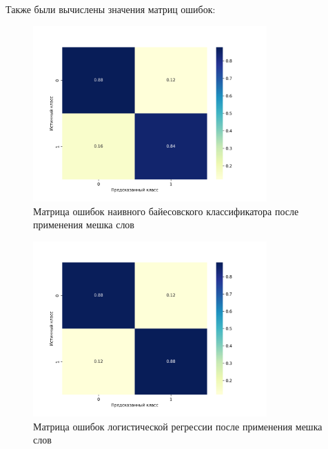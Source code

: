 \documentclass[bachelor, och, coursework]{SCWorks}
\begin{document}
        Также были вычислены значения матриц ошибок:

        \begin{figure}[H]
            \centering
            \includegraphics[width=0.8\textwidth]{pic/BOW-NB.png}
            \caption{Матрица ошибок наивного байесовского классификатора после применения мешка слов}
        \end{figure}

        \begin{figure}[H]
            \centering
            \includegraphics[width=0.8\textwidth]{pic/BOW-LR.png}
            \caption{Матрица ошибок логистической регрессии после применения мешка слов}
        \end{figure}
\end{document}
